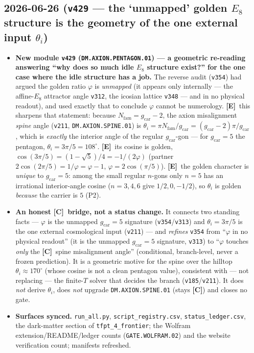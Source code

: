 \documentclass[11pt]{article}
\providecommand{\mE}{\textbf{[E]}}\providecommand{\mC}{\textbf{[C]}}
\providecommand{\vref}[1]{\texttt{#1}}
\providecommand{\gcar}{g_{\mathrm{car}}}\providecommand{\Nfam}{N_{\mathrm{fam}}}
\begin{document}
\subsection*{2026-06-26 (\texttt{v429} --- the `unmapped' golden $E_8$ structure is the geometry of the one external input $\theta_i$)}
\begin{itemize}
\item \textbf{New module \texttt{v429} (\texttt{DM.AXION.PENTAGON.01}) --- a geometric re-reading answering
``why does so much idle $E_8$ structure exist?'' for the one case where the idle structure has a job.}
The reverse audit (\vref{v354}) had argued the golden ratio $\varphi$ is \emph{unmapped} (it appears only
internally --- the affine-$E_8$ attractor angle \vref{v312}, the icosian lattice \vref{v348} --- and in no
physical readout), and used exactly that to conclude $\varphi$ cannot be numerology. \mE\ this sharpens that
statement: because $\Nfam{=}\gcar{-}2$, the axion misalignment \emph{spine} angle (\vref{v211},
\texttt{DM.AXION.SPINE.01}) is $\theta_i{=}\pi\Nfam/\gcar{=}(\gcar{-}2)\pi/\gcar$, which is \emph{exactly}
the interior angle of the regular $\gcar$-gon --- for $\gcar{=}5$ the pentagon, $\theta_i{=}3\pi/5{=}108^\circ$.
\mE\ its cosine is golden, $\cos(3\pi/5){=}(1{-}\sqrt5)/4{=}{-}1/(2\varphi)$ (partner $2\cos(2\pi/5){=}1/\varphi
{=}\varphi{-}1$, $\varphi{=}2\cos(\pi/5)$). \mE\ the golden character is \emph{unique} to $\gcar{=}5$: among the
small regular $n$-gons only $n{=}5$ has an irrational interior-angle cosine ($n{=}3,4,6$ give $1/2,0,-1/2$), so
$\theta_i$ is golden \emph{because} the carrier is $5$ (P2).
\item \textbf{An honest \mC\ bridge, not a status change.} It connects two standing facts --- $\varphi$ is the
unmapped $\gcar{=}5$ signature (\vref{v354}/\vref{v313}) and $\theta_i{=}3\pi/5$ is the one external cosmological
input (\vref{v211}) --- and \emph{refines} \vref{v354} from ``$\varphi$ in no physical readout'' (it is the unmapped $\gcar{=}5$ signature, \vref{v313}) to ``$\varphi$
touches \emph{only} the \mC\ spine misalignment angle'' (conditional, branch-level, never a frozen prediction).
It is a geometric motive for the spine over the hilltop $\theta_i{\approx}170^\circ$ (whose cosine is not a clean
pentagon value), consistent with --- not replacing --- the finite-$T$ solver that decides the branch
(\vref{v185}/\vref{v211}). It does \emph{not} derive $\theta_i$, does \emph{not} upgrade
\texttt{DM.AXION.SPINE.01} (stays \mC) and closes no gate.
\item \textbf{Surfaces synced.} \texttt{run\_all.py}, \texttt{script\_registry.csv},
\texttt{status\_ledger.csv}, the dark-matter section of \texttt{tfpt\_4\_frontier}; the Wolfram
extension/README/ledger counts (\texttt{GATE.WOLFRAM.02}) and the website verification count; manifests refreshed.
\end{itemize}
\end{document}

